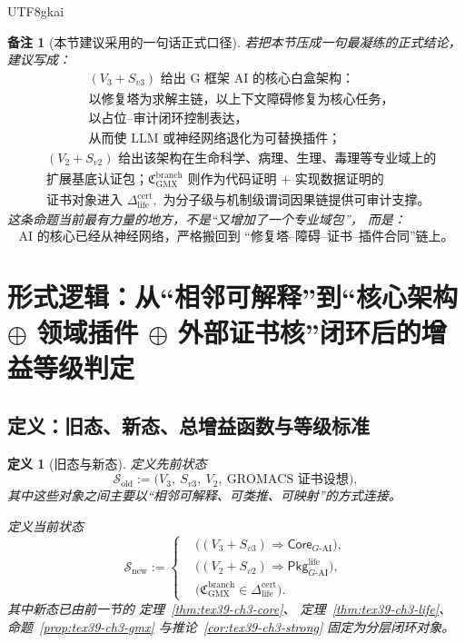 \documentclass[12pt]{article}
\newtheorem{definition}{定义}[section]
\newtheorem{remark}{备注}[section]
\begin{document}
\begin{CJK*}{UTF8}{gkai}
\begin{remark}[本节建议采用的一句话正式口径]
若把本节压成一句最凝练的正式结论，
建议写成：
\[
  \boxed{
    \begin{aligned}
      &(V_3+S_{v3})\text{ 给出 G 框架 AI 的核心白盒架构：}\\
      &\text{以修复塔为求解主链，以上下文障碍修复为核心任务，}\\
      &\text{以占位--审计闭环控制表达，}\\
      &\text{从而使 LLM 或神经网络退化为可替换插件；}
    \end{aligned}
  }
\]
\[
  \boxed{
    \begin{aligned}
      &(V_2+S_{v2})\text{ 给出该架构在生命科学、病理、生理、毒理等专业域上的}\\
      &\text{扩展基底认证包；}
      \mathfrak C_{\mathrm{GMX}}^{\mathrm{branch}}
      \text{ 则作为代码证明 + 实现数据证明的}\\
      &\text{证书对象进入 }
      \Delta_{\mathrm{life}}^{\mathrm{cert}},
      \text{ 为分子级与机制级谓词因果链提供可审计支撑。}
    \end{aligned}
  }
\]
这条命题当前最有力量的地方，不是“又增加了一个专业域包”，
而是：
\[
  \boxed{
    \text{AI 的核心已经从神经网络，严格搬回到
    “修复塔--障碍--证书--插件合同”链上。}
  }
\]
\end{remark}

\section{形式逻辑：从“相邻可解释”到“核心架构 \texorpdfstring{$\oplus$}{+} 领域插件 \texorpdfstring{$\oplus$}{+} 外部证书核”闭环后的增益等级判定}
\label{sec:tex39-ch4}

\subsection{定义：旧态、新态、总增益函数与等级标准}
\label{subsec:tex39-ch4-definitions}

\begin{definition}[旧态与新态]
\label{def:tex39-ch4-state}
定义先前状态
\[
  \mathcal S_{\mathrm{old}}
  :=
  \bigl(
    V_3,\
    S_{v3},\
    V_2,\
    \text{GROMACS 证书设想}
  \bigr),
\]
其中这些对象之间主要以“相邻可解释、可类推、可映射”的方式连接。

定义当前状态
\[
  \mathcal S_{\mathrm{new}}
  :=
  \left\{
  \begin{aligned}
    &\bigl((V_3+S_{v3})\Rightarrow \mathsf{Core}_{G\text{-AI}}\bigr),\\
    &\bigl((V_2+S_{v2})\Rightarrow \mathsf{Pkg}_{G\text{-AI}}^{\mathrm{life}}\bigr),\\
    &\bigl(\mathfrak C_{\mathrm{GMX}}^{\mathrm{branch}}
    \in
    \Delta_{\mathrm{life}}^{\mathrm{cert}}\bigr).
  \end{aligned}
  \right.
\]
其中新态已由前一节的
定理~\ref{thm:tex39-ch3-core}、
定理~\ref{thm:tex39-ch3-life}、
命题~\ref{prop:tex39-ch3-gmx}
与推论~\ref{cor:tex39-ch3-strong}
固定为分层闭环对象。
\end{definition}


\end{CJK*}
\end{document}
